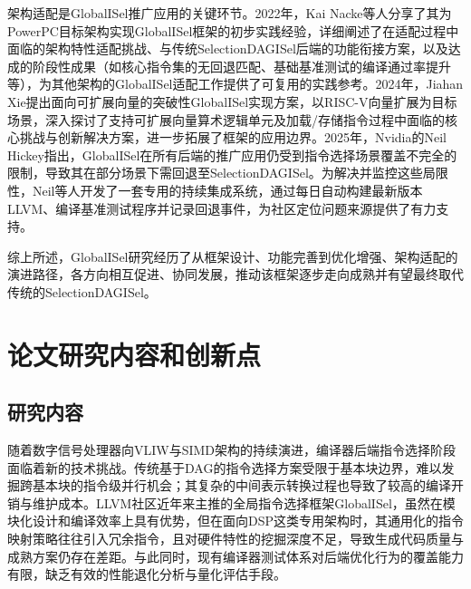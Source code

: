 \par

架构适配是GlobalISel推广应用的关键环节。2022年，Kai Nacke等人分享了其为PowerPC目标架构实现GlobalISel框架的初步实践经验\cite{Nacke2022PowerPCGlobalISel}，详细阐述了在适配过程中面临的架构特性适配挑战、与传统SelectionDAGISel后端的功能衔接方案，以及达成的阶段性成果（如核心指令集的无回退匹配、基础基准测试的编译通过率提升等），为其他架构的GlobalISel适配工作提供了可复用的实践参考。2024年，Jiahan Xie提出面向可扩展向量的突破性GlobalISel实现方案，以RISC-V向量扩展为目标场景，深入探讨了支持可扩展向量算术逻辑单元及加载/存储指令过程中面临的核心挑战与创新解决方案\cite{Xie2024ScalableVectorGlobalISel}，进一步拓展了框架的应用边界。2025年，Nvidia的Neil Hickey指出，GlobalISel在所有后端的推广应用仍受到指令选择场景覆盖不完全的限制，导致其在部分场景下需回退至SelectionDAGISel\cite{Hickey2025GlobalISelCI}。为解决并监控这些局限性，Neil等人开发了一套专用的持续集成系统，通过每日自动构建最新版本LLVM、编译基准测试程序并记录回退事件，为社区定位问题来源提供了有力支持。

\par

综上所述，GlobalISel研究经历了从框架设计、功能完善到优化增强、架构适配的演进路径，各方向相互促进、协同发展，推动该框架逐步走向成熟并有望最终取代传统的SelectionDAGISel。


\section{论文研究内容和创新点}


\subsection{研究内容}
随着数字信号处理器向VLIW与SIMD架构的持续演进，编译器后端指令选择阶段面临着新的技术挑战。传统基于DAG的指令选择方案受限于基本块边界，难以发掘跨基本块的指令级并行机会；其复杂的中间表示转换过程也导致了较高的编译开销与维护成本。LLVM社区近年来主推的全局指令选择框架GlobalISel，虽然在模块化设计和编译效率上具有优势，但在面向DSP这类专用架构时，其通用化的指令映射策略往往引入冗余指令，且对硬件特性的挖掘深度不足，导致生成代码质量与成熟方案仍存在差距。与此同时，现有编译器测试体系对后端优化行为的覆盖能力有限，缺乏有效的性能退化分析与量化评估手段。

\par

